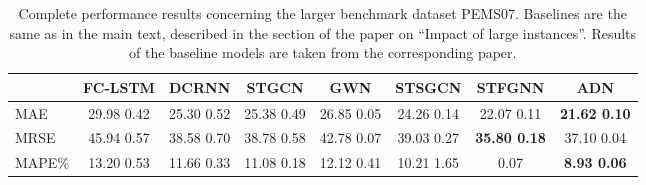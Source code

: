 \documentclass[a4paper]{article}
\begin{document}
\begin{table}
    \centering
    \begin{tabular}{l || c | c | c | c | c | c | c}
         & FC-LSTM & DCRNN & STGCN & GWN & STSGCN & STFGNN & ADN \\
         \hline
         MAE & 29.98  0.42 & 25.30  0.52 & 25.38  0.49 & 26.85  0.05 & 24.26  0.14 & 22.07  0.11 & \textbf{21.62  0.10} \\
         MRSE & 45.94  0.57 & 38.58  0.70 & 38.78  0.58 & 42.78  0.07 & 39.03  0.27 & \textbf{35.80  0.18} & 37.10  0.04 \\
         MAPE\% & 13.20  0.53 & 11.66  0.33 & 11.08  0.18 & 12.12  0.41 & 10.21  1.65 & \: 9.21  0.07 & \:  \textbf{8.93  0.06} \\
         \hline
    \end{tabular}
    \caption{Complete performance results concerning the larger benchmark dataset PEMS07. Baselines are the same as in the main text, described in the section of the paper on ``Impact of large instances''. Results of the baseline models are taken from the corresponding paper.}
    \label{fig:pems07-results2}
\end{table}
\end{document}
